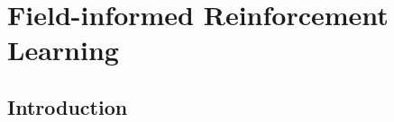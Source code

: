 %

%
\chapter{Field-informed Reinforcement Learning} %

%

\newcommand{\ga}[1]{\meta{red}{GA}{#1}}
\newcommand{\lukas}[1]{\meta{purple}{Lukas}{#1}}
\newcommand{\mv}[1]{\meta{green}{MV}{#1}}
\newcommand{\review}[1]{{#1}}

\section{Introduction}

%
%


